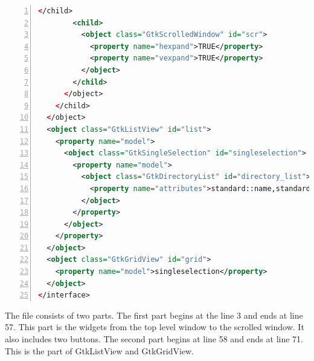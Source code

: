 \begin{lstlisting}[language=XML, numbers=left]
        </child>
        <child>
          <object class="GtkScrolledWindow" id="scr">
            <property name="hexpand">TRUE</property>
            <property name="vexpand">TRUE</property>
          </object>
        </child>
      </object>
    </child>
  </object>
  <object class="GtkListView" id="list">
    <property name="model">
      <object class="GtkSingleSelection" id="singleselection">
        <property name="model">
          <object class="GtkDirectoryList" id="directory_list">
            <property name="attributes">standard::name,standard::icon,standard::content-type</property>
          </object>
        </property>
      </object>
    </property>
  </object>
  <object class="GtkGridView" id="grid">
    <property name="model">singleselection</property>
  </object>
</interface>
\end{lstlisting}

The file consists of two parts. The first part begins at the line 3 and
ends at line 57. This part is the widgets from the top level window to
the scrolled window. It also includes two buttons. The second part
begins at line 58 and ends at line 71. This is the part of GtkListView
and GtkGridView.


